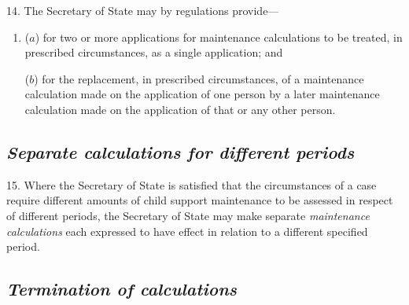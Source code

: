 \documentclass[12pt,a4paper]{article}
\begin{document}
14. The Secretary of State may by regulations provide—
\begin{enumerate}\item[]
($a$) for two or more applications for maintenance calculations to be treated, in prescribed circumstances, as a single application; and

($b$) for the replacement, in prescribed circumstances, of a maintenance calculation made on the application of one person by a later maintenance calculation made on the application of that or any other person.
\end{enumerate}


\subsection*{\itshape Separate 
\emph{calculations}  %
for different periods}

15. Where 
the 
Secretary of State  %
is satisfied that the circumstances of a case require different amounts of child support maintenance to be assessed in respect of different periods, 
the Secretary of State  %
may make separate 
\emph{maintenance calculations}  %
each expressed to have effect in relation to a different specified period.


\subsection*{\itshape Termination of 
\emph{calculations}  %
}
\end{document}
